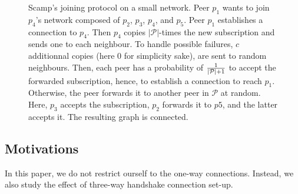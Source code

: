 \begin{figure}
  \centering
  
  \caption{\label{fig:scampexample} Scamp's joining protocol on a small
    network. Peer $p_1$ wants to join $p_4$'s network composed of $p_2$,
    $p_3$, $p_4$, and $p_5$. Peer $p_1$ establishes a connection to $p_4$. Then
    $p_4$ copies $|\mathcal{P}|$-times the new subscription and sends one to
    each neighbour. To handle possible failures, $c$ additionnal copies (here
    $0$ for simplicity sake), are sent to random neighbours. Then, each peer
    has a probability of $1\over{|\mathcal{P}|+1}$ to accept the forwarded
    subscription, hence, to establish a connection to reach $p_1$. Otherwise,
    the peer forwards it to another peer in $\mathcal{P}$ at random. Here,
    $p_3$ accepts the subscription, $p_2$ forwards it to $p5$, and the latter
    accepts it. The resulting graph is connected.}
\end{figure}

\subsection{Motivations}
In this paper, we do not restrict ourself to the one-way connections. Instead,
we also study the effect of three-way handshake connection set-up. 


